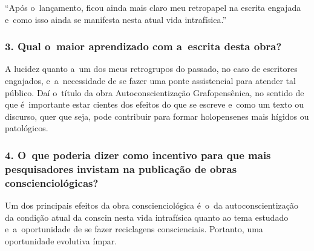 \documentclass{gescons}
\begin{document}
\begin{multicols}{2}
\begin{pullquote}
``Após o~lançamento, ficou ainda mais claro meu retropapel na escrita engajada e~como isso ainda se manifesta nesta atual vida intrafísica.''
\end{pullquote}

\subsubsection{3. Qual o~maior aprendizado com a~escrita desta obra?}

A lucidez quanto a~um dos meus retrogrupos do passado, no caso de
escritores engajados, e~a~necessidade de se fazer uma ponte assistencial
para atender tal público. Daí o~título da obra Autoconscientização
Grafopensênica, no sentido de que é~importante estar cientes dos efeitos
do que se escreve e~como um texto ou discurso, quer que seja, pode
contribuir para formar holopensenes mais hígidos ou patológicos.

\subsubsection{4. O~que poderia dizer como incentivo para que mais pesquisadores invistam na publicação de obras conscienciológicas?}

Um dos principais efeitos da obra conscienciológica é~o~da
autoconscientização da condição atual da conscin nesta vida intrafísica
quanto ao tema estudado e~a~oportunidade de se fazer reciclagens
conscienciais. Portanto, uma oportunidade evolutiva ímpar.

    
    \end{multicols}
\end{document}
